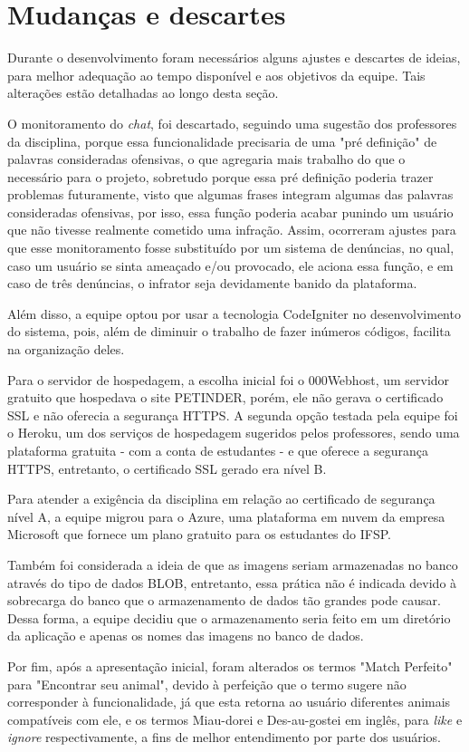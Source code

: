 \section{Mudanças e descartes}
\label{mudancas}

Durante o desenvolvimento foram necessários alguns ajustes e descartes de ideias, para melhor adequação ao tempo disponível e aos objetivos da equipe. Tais alterações estão detalhadas ao longo desta seção.

O monitoramento do \textit{chat}, foi descartado, seguindo uma sugestão dos professores da disciplina, porque essa funcionalidade precisaria de uma "pré definição" \space de palavras consideradas ofensivas, o que agregaria mais trabalho do que o necessário para o projeto, sobretudo porque essa pré definição poderia trazer problemas futuramente, visto que algumas frases integram algumas das palavras consideradas ofensivas, por isso, essa função poderia acabar punindo um usuário que não tivesse realmente cometido uma infração. Assim, ocorreram ajustes para que esse monitoramento fosse substituído por um sistema de denúncias, no qual, caso um usuário se sinta ameaçado e/ou provocado, ele aciona essa função, e em caso de três denúncias, o infrator seja devidamente banido da plataforma.

Além disso, a equipe optou por usar a tecnologia \gls{CodeIgniter} no desenvolvimento do sistema, pois, além de diminuir o trabalho de fazer inúmeros códigos, facilita na organização deles.

Para o servidor de hospedagem, a escolha inicial foi o \gls{000Webhost}, um servidor gratuito que hospedava o site PETINDER, porém, ele não gerava o certificado \ac{SSL} e não oferecia a segurança \ac{HTTPS}. A segunda opção testada pela equipe foi o \gls{Heroku}, um dos serviços de hospedagem sugeridos pelos professores, sendo uma plataforma gratuita - com a conta de estudantes -  e que oferece a segurança \ac{HTTPS},  entretanto, o certificado \ac{SSL} gerado era nível B. 

Para atender a exigência da disciplina em relação ao certificado de segurança nível A, a equipe migrou para o Azure, uma plataforma em nuvem da empresa Microsoft que fornece um plano gratuito para os estudantes do \ac{IFSP}. 

Também foi considerada a ideia de que as imagens seriam armazenadas no banco através do tipo de dados \ac{BLOB}, entretanto, essa prática não é indicada devido à sobrecarga do banco que o armazenamento de dados tão grandes pode causar. Dessa forma, a equipe decidiu que o armazenamento seria feito em um diretório da aplicação e apenas os nomes das imagens no banco de dados.

Por fim, após a apresentação inicial, foram alterados os termos "\gls{Match} Perfeito" para "Encontrar seu animal", devido à perfeição que o termo sugere não corresponder à funcionalidade, já que esta retorna ao usuário diferentes animais compatíveis com ele, e os termos \gls{Miau-dorei} e \gls{Des-au-gostei} em inglês, para \textit{like} e \textit{ignore} respectivamente, a fins de melhor entendimento por parte dos usuários.

